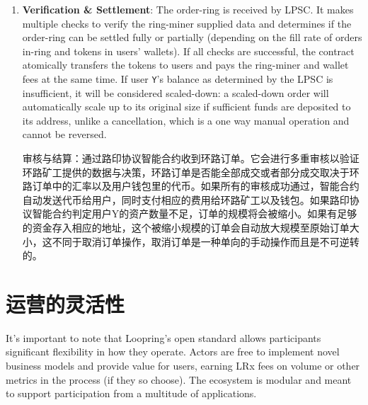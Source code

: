 \documentclass[UTF8,nofonts]{ctexart}
\makeatletter
\newenvironment{figurehere}
 {\def\@captype{figure}}
 {}
\makeatother
\begin{document}
\begin{multicols}{2}
\begin{enumerate}
\item \textbf{Verification \& Settlement}: The order-ring is received by LPSC. It makes multiple checks to verify the ring-miner supplied data and determines if the order-ring can be settled fully or partially (depending on the fill rate of orders in-ring and tokens in users' wallets). If all checks are successful, the contract atomically transfers the tokens to users and pays the ring-miner and wallet fees at the same time. If user \verb|Y|'s balance as determined by the LPSC is insufficient, it will be considered scaled-down: a scaled-down order will automatically scale up to its original size if sufficient funds are deposited to its address, unlike a cancellation, which is a one way manual operation and cannot be reversed.

审核与结算：通过路印协议智能合约收到环路订单。它会进行多重审核以验证环路矿工提供的数据与决策，环路订单是否能全部成交或者部分成交取决于环路订单中的汇率以及用户钱包里的代币。如果所有的审核成功通过，智能合约自动发送代币给用户，同时支付相应的费用给环路矿工以及钱包。如果路印协议智能合约判定用户Y的资产数量不足，订单的规模将会被缩小。如果有足够的资金存入相应的地址，这个被缩小规模的订单会自动放大规模至原始订单大小，这不同于取消订单操作，取消订单是一种单向的手动操作而且是不可逆转的。



\end{enumerate}





%
%
%

\section{运营的灵活性\label{sec:business_model}}
It's important to note that Loopring's open standard allows participants significant flexibility in how they operate. Actors are free to implement novel business models and provide value for users, earning LRx fees on volume or other metrics in the process (if they so choose). The ecosystem is modular and meant to support participation from a multitude of applications.


\end{multicols}
\end{document}
